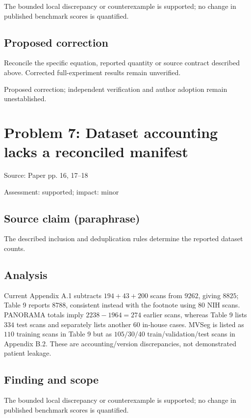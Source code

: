 \documentclass[11pt]{article}
\begin{document}
The bounded local discrepancy or counterexample is supported; no change in published benchmark scores is quantified.

\subsection*{Proposed correction}

Reconcile the specific equation, reported quantity or source contract described above. Corrected full-experiment results remain unverified.

Proposed correction; independent verification and author adoption remain unestablished.

\section*{Problem 7: Dataset accounting lacks a reconciled manifest}

Source: Paper pp. 16, 17–18

Assessment: supported; impact: minor

\subsection*{Source claim (paraphrase)}

The described inclusion and deduplication rules determine the reported dataset counts.

\subsection*{Analysis}

Current Appendix A.1 subtracts \(194+43+200\) scans from \(9262\), giving \(8825\); Table 9 reports \(8788\), consistent instead with the footnote using \(80\) NIH scans. PANORAMA totals imply \(2238-1964=274\) earlier scans, whereas Table 9 lists \(334\) test scans and separately lists another \(60\) in-house cases. MVSeg is listed as \(110\) training scans in Table 9 but as \(105/30/40\) train/validation/test scans in Appendix B.2. These are accounting/version discrepancies, not demonstrated patient leakage.

\subsection*{Finding and scope}

The bounded local discrepancy or counterexample is supported; no change in published benchmark scores is quantified.
\end{document}
